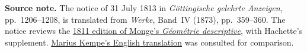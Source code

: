 \par\medskip\begin{small}\noindent\textbf{Source note.} The notice of 31 July 1813 in \textit{Göttingische gelehrte Anzeigen}, pp.~1206--1208, is translated from \textit{Werke}, Band~IV (1873), pp.~359--360. The notice reviews the \href{https://www.e-rara.ch/zut/content/titleinfo/16072281}{1811 edition of Monge’s \textit{Géométrie descriptive}}, with Hachette’s supplement. \href{https://mariuskempe.github.io/Writing/Gauss.pdf}{Marius Kempe’s English translation} was consulted for comparison.\par\end{small}
